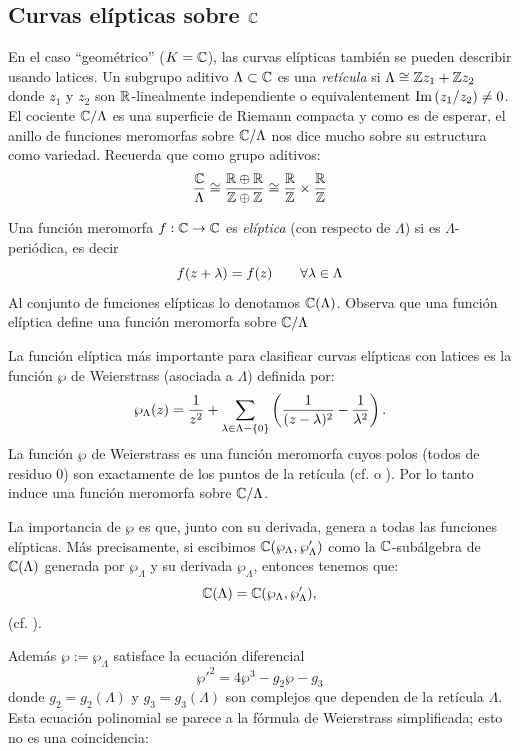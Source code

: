 \subsection{Curvas el\'ipticas sobre $\mathbb{C}$}

En el caso ``geom\'etrico'' ($K=\mathbb{C}$), las curvas el\'ipticas tambi\'en se pueden describir usando
latices. Un subgrupo aditivo $\Lambda\subset\mathbb{C}$ es una \emph{ret\'icula} si
$\Lambda\cong\mathbb{Z} z_1+\mathbb{Z} z_2$ donde $z_1$ y $z_2$ son $\mathbb{R}$-linealmente independiente o
equivalentement $\mathrm{Im}\left( z_1/z_2 \right)\neq 0$. El cociente $\mathbb{C}/\Lambda$ es una superficie de Riemann
compacta y como es de esperar, el anillo de funciones meromorfas sobre $\mathbb{C}/\Lambda$ nos dice
mucho sobre su estructura como variedad. Recuerda que como grupo aditivos:
\[
  \frac{\mathbb{C}}{\Lambda}\cong\frac{\mathbb{R}\oplus\mathbb{R}}{\mathbb{Z}\oplus\mathbb{Z}}\cong\frac{\mathbb{R}}{\mathbb{Z}}\times\frac{\mathbb{R}}{\mathbb{Z}}
\]


\begin{defin}
  Una funci\'on meromorfa $f:\mathbb{C}\rightarrow\mathbb{C}$ es \emph{el\'iptica} (con respecto de $\Lambda$) si es
  $\Lambda$-peri\'odica, es decir
  \[
    f(z+\lambda)=f(z) \qquad\forall \lambda\in\Lambda
  \]
  Al conjunto de funciones el\'ipticas lo denotamos $\mathbb{C}(\Lambda)$. Observa que una funci\'on
  el\'iptica define una funci\'on meromorfa sobre $\mathbb{C}/\Lambda$
\end{defin}

La funci\'on el\'iptica m\'as importante para clasificar curvas el\'ipticas con latices es la
funci\'on $\wp$ de Weierstrass (asociada a $\Lambda$) definida por:
\[
  \wp_{\Lambda}(z)=\frac{1}{z^2}+
  \sum_{\lambda\in\Lambda-\{0\}}\left( \frac{1}{(z-\lambda)^2}-\frac{1}{\lambda^2} \right).
\]
La funci\'on $\wp$ de Weierstrass es una funci\'on meromorfa cuyos polos (todos de residuo 0)
son exactamente de los puntos de la ret\'icula (cf. \cite[\S1.6, teorema 1.10]{ApostolMFADSINT} o
\cite[cap\'itulo 7, \S 3]{AhlforsCA}).  Por lo tanto induce una funci\'on meromorfa sobre
$\mathbb{C}/\Lambda$.

La importancia de $\wp$ es que, junto con su derivada, genera a todas las funciones el\'ipticas.
M\'as precisamente, si escibimos $\mathbb{C}(\wp_{\Lambda},\wp'_{\Lambda})$ como la $\mathbb{C}$-sub\'algebra de
$\mathbb{C}(\Lambda)$ generada por $\wp_{\Lambda}$ y su derivada $\wp_{\Lambda}$, entonces tenemos que:
\[
  \mathbb{C}(\Lambda) = \mathbb{C}(\wp_{\Lambda},\wp'_{\Lambda}),
\]
(cf. \cite[cap\'itlo VI, teorema 3.2]{SilvermanTAOEC}).

Adem\'as $\wp:=\wp_{\Lambda}$ satisface la ecuaci\'on diferencial
\[
  \wp'^2=4\wp^3-g_2\wp-g_3
\]
donde $g_2=g_2(\Lambda)$ y $g_3=g_3(\Lambda)$ son complejos que dependen de la ret\'icula $\Lambda$.
Esta ecuaci\'on polinomial se parece a la f\'ormula de Weierstrass simplificada; esto no es una
coincidencia:

